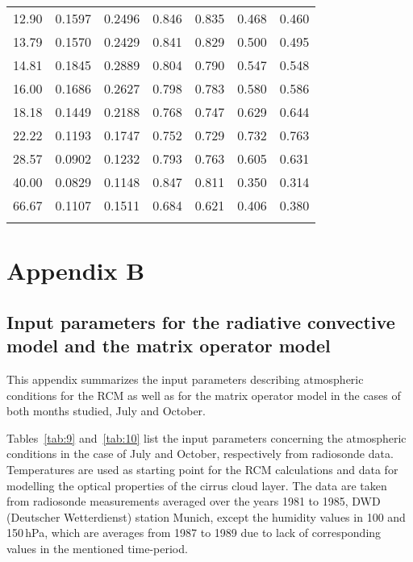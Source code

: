 \documentclass[agp]{svjour}
\begin{document}
\begin{appendix}
\begin{table}
\begin{tabular*}{84.22mm}{@{\hspace{0pt}\extracolsep{\fill}}ccccccc@{\hspace{0pt}}}
12.90 &0.1597 &0.2496 &0.846 &0.835 &0.468 &0.460 \\
13.79 &0.1570 &0.2429 &0.841 &0.829 &0.500 &0.495 \\
14.81 &0.1845 &0.2889 &0.804 &0.790 &0.547 &0.548 \\
16.00 &0.1686 &0.2627 &0.798 &0.783 &0.580 &0.586 \\
18.18 &0.1449 &0.2188 &0.768 &0.747 &0.629 &0.644 \\
22.22 &0.1193 &0.1747 &0.752 &0.729 &0.732 &0.763 \\
28.57 &0.0902 &0.1232 &0.793 &0.763 &0.605 &0.631 \\
40.00 &0.0829 &0.1148 &0.847 &0.811 &0.350 &0.314 \\
66.67 &0.1107 &0.1511 &0.684 &0.621 &0.406 &0.380 \\
\noalign{\smallskip}
\hline
\end{tabular*}
\label{tab:8}
\end{table}

\section*{Appendix B}
\label{sec:b}

\subsection*{Input parameters for the radiative convective model and the
matrix operator model}

This appendix summarizes the input parameters describing atmospheric
conditions for the RCM as well as for the matrix operator model in the
cases of both months studied, July and October.

Tables~\ref{tab:9} and~\ref{tab:10} list the input parameters concerning
the atmospheric conditions in the case of July and October, respectively
from radiosonde data. Temperatures are used as starting point for the
RCM calculations and data for modelling the optical properties of the
cirrus cloud layer. The data are taken from radiosonde measurements
averaged over the years 1981 to 1985, DWD (Deutscher Wetterdienst)
station Munich, except the humidity values in 100 and 150\,hPa, which
are averages from 1987 to 1989 due to lack of corresponding values in
the mentioned time-period.


\end{appendix}
\end{document}
